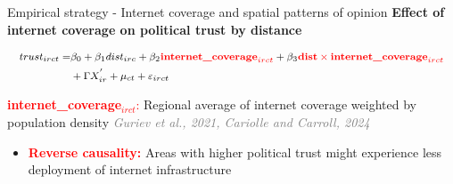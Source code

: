 \documentclass[10pt]{beamer}
\begin{document}
\begin{frame}{{\fontsize{13}{12}\selectfont
    Empirical strategy - Internet coverage and spatial patterns of opinion}}
\centering \textcolor{rougeprez}{\textbf{Effect of internet coverage on political trust by distance}}\vspace{1em}

\begin{equation}
    \fontsize{8}{10}\selectfont
\begin{split}
trust_{irct} = & \beta_{0} + \beta_{1} dist_{irc} + \beta_{2} \textcolor{red}{\textbf{internet\_coverage}_{irct}} + \beta_{3} \textcolor{red}{\textbf{dist} \times \textbf{internet\_coverage}_{irct}} \\
& + \Gamma X^{'}_{ir} + \mu_{ct}+ \varepsilon_{irct}
\end{split}
\end{equation}\vspace{1em}

\noindent
{\fontsize{9}{12}\selectfont
\textcolor{red}{\textbf{internet\_coverage}$_{irct}$:} Regional average of internet coverage weighted by population density \textcolor{gray}{\textit{Guriev et al., 2021, Cariolle and Carroll, 2024}}
}
\vfill

\begin{itemize}\setlength\itemsep{1em}

    \item \textcolor{red}{\textbf{Reverse causality:}} Areas with higher political trust might experience less deployment of internet infrastructure
\end{itemize}
\end{frame}
\end{document}

